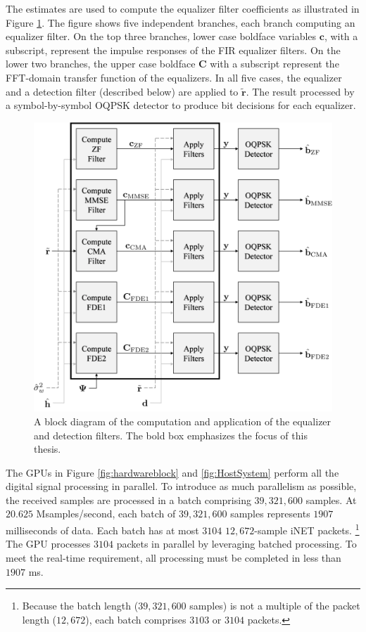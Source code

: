 The estimates are used to compute the equalizer filter coefficients as illustrated in Figure \ref{fig:thisThesisBlock}.
The figure shows five independent branches,
each branch computing an equalizer filter.
On the top three branches, lower case boldface variables $\mathbf{c}$, with a subscript, represent the impulse responses of the FIR equalizer filters. 
On the lower two branches, the upper case boldface $\mathbf{C}$ with a subscript represent the FFT-domain transfer function of the equalizers.
In all five cases, the equalizer and a detection filter (described below) are applied to $\tilde{\mathbf{r}}$.
The result processed by a symbol-by-symbol OQPSK detector to produce bit decisions for each equalizer.
\begin{figure}
	\centering\includegraphics[width=10.45in/100*55]{figures/intro/thisThesisBlock5.pdf}
	\caption{A block diagram of the computation and application of the equalizer and detection filters. The bold box emphasizes the focus of this thesis.}
	\label{fig:thisThesisBlock}
\end{figure}

The GPUs in Figure \ref{fig:hardwareblock} and \ref{fig:HostSystem} perform all the digital signal processing in parallel.
To introduce as much parallelism as possible, the received samples are processed in a batch comprising $39{,}321{,}600$ samples. 
At $20.625$ Msamples/second, each batch of $39{,}321{,}600$ samples represents $1907$ milliseconds of data.
Each batch has at most $3104$ $12{,}672$-sample iNET packets.%
\footnote{Because the batch length ($39{,}321{,}600$ samples) is not a multiple of the packet length ($12{,}672$), each batch comprises $3103$ or $3104$ packets.}
The GPU processes $3104$ packets in parallel by leveraging batched processing.
To meet the real-time requirement, all processing must be completed in less than $1907$ ms.


